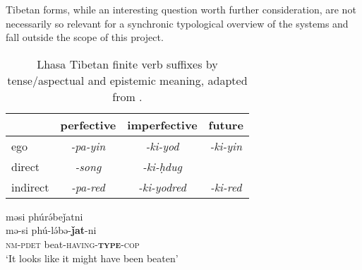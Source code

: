 Tibetan forms, while an interesting question worth further consideration, are not necessarily so relevant for a synchronic typological overview of the systems and fall outside the scope of this project. 

\begin{table}
        \begin{tabular}{l|c|c|c}
         & perfective       & imperfective         & future           \\ \hline
        ego                  & \textit{-pa-yin} & \textit{-ki-yod}     & \textit{-ki-yin} \\
        direct               & \textit{-song}   & \textit{-ki-ḥdug}    & \textit{}        \\
        indirect             & \textit{-pa-red} & \textit{-ki-yodred} & \textit{-ki-red}
        \end{tabular}
        \caption{Lhasa Tibetan finite verb suffixes by tense/aspectual and epistemic meaning, adapted from .}\label{t:Description:LhasaTibetanFinite}
\end{table}

\begin{exe}
        \ex\label{e:Description:MeitheiNominaliser}
        \glll məsi phúrə́beǰatni \\
        mə-si phú-lə́bə-\textbf{ǰat}-ni \\
        \textsc{nm-pdet} beat-\textsc{having-\textbf{type}-cop} \\
        \glt `It looks like it might have been beaten' \\
        \cite[Meithei,][296]{Chelliah1997}
\end{exe}

